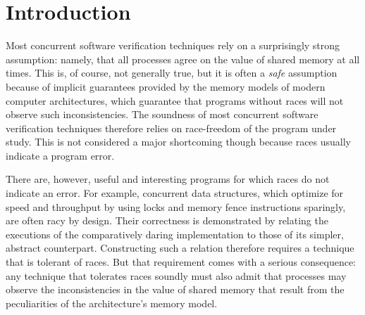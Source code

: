 \documentclass[11pt]{report}         %
\begin{document}





\chapter{Introduction}
\label{ch:introduction}

Most concurrent software verification techniques rely on a
surprisingly strong assumption: namely, that all processes agree on
the value of shared memory at all times. This is, of course, not
generally true, but it is often a \emph{safe} assumption because of
implicit guarantees provided by the memory models of modern computer
architectures, which guarantee that programs without races will not
observe such inconsistencies. The soundness of most concurrent
software verification techniques therefore relies on race-freedom of
the program under study. This is not considered a major shortcoming
though because races usually indicate a program error.

There are, however, useful and interesting programs for which races do not indicate an error. For example, concurrent data structures, which optimize for speed and throughput by using locks and memory fence instructions sparingly, are often racy by design. Their correctness is demonstrated by relating the executions of the comparatively daring implementation to those of its simpler, abstract counterpart. Constructing such a relation therefore requires a technique that is tolerant of races. But that requirement comes with a serious consequence: any technique that tolerates races soundly must also admit that processes may observe the inconsistencies in the value of shared memory that result from the peculiarities of the architecture's memory model.
\end{document}

